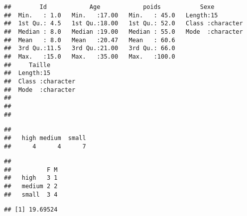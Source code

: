 \documentclass[
]{article}
\newenvironment{Shaded}{\begin{snugshade}}{\end{snugshade}}
\newcommand{\CommentTok}[1]{\textcolor[rgb]{0.56,0.35,0.01}{\textit{#1}}}
\newcommand{\FunctionTok}[1]{\textcolor[rgb]{0.00,0.00,0.00}{#1}}
\newcommand{\NormalTok}[1]{#1}
\newcommand{\SpecialCharTok}[1]{\textcolor[rgb]{0.00,0.00,0.00}{#1}}
\begin{document}
\begin{verbatim}
##        Id            Age            poids           Sexe          
##  Min.   : 1.0   Min.   :17.00   Min.   : 45.0   Length:15         
##  1st Qu.: 4.5   1st Qu.:18.00   1st Qu.: 52.0   Class :character  
##  Median : 8.0   Median :19.00   Median : 55.0   Mode  :character  
##  Mean   : 8.0   Mean   :20.47   Mean   : 60.6                     
##  3rd Qu.:11.5   3rd Qu.:21.00   3rd Qu.: 66.0                     
##  Max.   :15.0   Max.   :35.00   Max.   :100.0                     
##     Taille         
##  Length:15         
##  Class :character  
##  Mode  :character  
##                    
##                    
## 
\end{verbatim}

\begin{Shaded}
\end{Shaded}

\begin{verbatim}
## 
##   high medium  small 
##      4      4      7
\end{verbatim}

\begin{Shaded}
\end{Shaded}

\begin{verbatim}
##         
##          F M
##   high   3 1
##   medium 2 2
##   small  3 4
\end{verbatim}

\begin{Shaded}
\end{Shaded}

\begin{verbatim}
## [1] 19.69524
\end{verbatim}

\begin{Shaded}
\end{Shaded}
\end{document}
